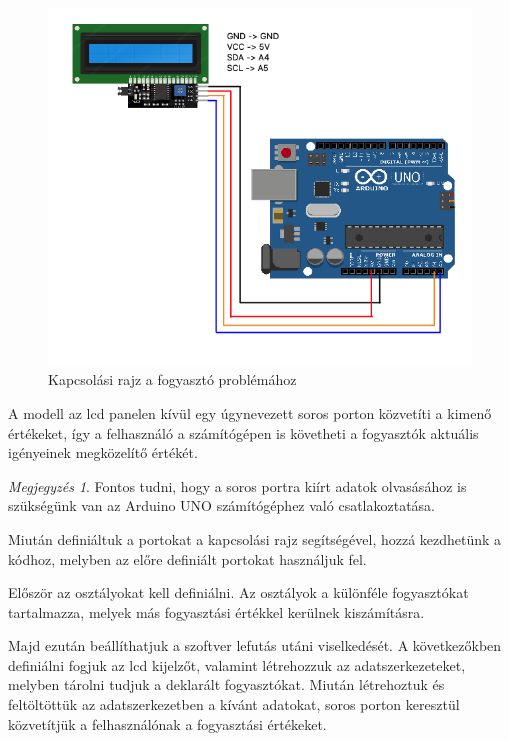 \documentclass[
]{thesis-ekf}
\theoremstyle{definition}
\theoremstyle{remark}
\newtheorem{megjegyzes}[tetel]{Megjegyzés}
\begin{document}
			\begin{figure}[H]
				\centering
				\includegraphics[scale=0.30]{./images/consumeProblem}
				\caption{Kapcsolási rajz a fogyasztó problémához}
			\end{figure}
			\par A modell az lcd panelen kívül egy úgynevezett soros porton közvetíti a kimenő értékeket, így a felhasználó a számítógépen is követheti a fogyasztók aktuális igényeinek megközelítő értékét.
			\begin{megjegyzes}
				Fontos tudni, hogy a soros portra kiírt adatok olvasásához is szükségünk van az Arduino UNO számítógéphez való csatlakoztatása.
			\end{megjegyzes}
			\par Miután definiáltuk a portokat a kapcsolási rajz segítségével, hozzá kezdhetünk a kódhoz, melyben az előre definiált portokat használjuk fel.
			\par Először az osztályokat kell definiálni. Az osztályok a különféle fogyasztókat tartalmazza, melyek más fogyasztási értékkel kerülnek kiszámításra.
						
			\par Majd ezután beállíthatjuk a szoftver lefutás utáni viselkedését. A következőkben definiálni fogjuk az lcd kijelzőt, valamint létrehozzuk az adatszerkezeteket, melyben tárolni tudjuk a deklarált fogyasztókat. Miután létrehoztuk és feltöltöttük az adatszerkezetben a kívánt adatokat, soros porton keresztül közvetítjük a felhasználónak a fogyasztási értékeket. 
\end{document}
